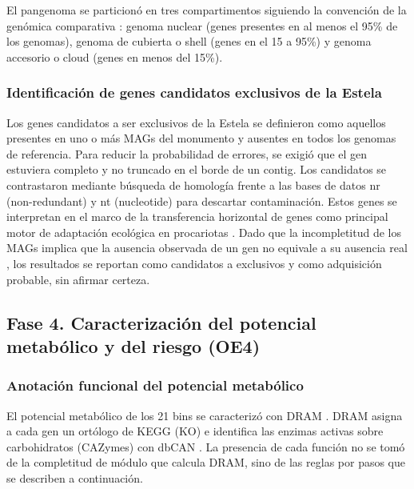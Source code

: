 El pangenoma se particionó en tres compartimentos siguiendo la convención de la genómica comparativa \cite{panaroo2020, tettelin2005, Page2015}: genoma nuclear (genes presentes en al menos el 95\% de los genomas), genoma de cubierta o shell (genes en el 15 a 95\%) y genoma accesorio o cloud (genes en menos del 15\%).

\subsubsection{Identificación de genes candidatos exclusivos de la Estela}

Los genes candidatos a ser exclusivos de la Estela se definieron como aquellos presentes en uno o más MAGs del monumento y ausentes en todos los genomas de referencia. Para reducir la probabilidad de errores, se exigió que el gen estuviera completo y no truncado en el borde de un contig. Los candidatos se contrastaron mediante búsqueda de homología frente a las bases de datos nr (non-redundant) y nt (nucleotide) para descartar contaminación. Estos genes se interpretan en el marco de la transferencia horizontal de genes como principal motor de adaptación ecológica en procariotas \cite{soucy2015}. Dado que la incompletitud de los MAGs implica que la ausencia observada de un gen no equivale a su ausencia real \cite{bowers2017}, los resultados se reportan como candidatos a exclusivos y como adquisición probable, sin afirmar certeza.

\subsection{Fase 4. Caracterización del potencial metabólico y del riesgo (OE4)}

\subsubsection{Anotación funcional del potencial metabólico}
\begin{nuevo}
El potencial metabólico de los 21 bins se caracterizó con DRAM \cite{dram2020}.
DRAM asigna a cada gen un ortólogo de KEGG (KO) e identifica las enzimas
activas sobre carbohidratos (CAZymes) con dbCAN \cite{zhang2018}. La presencia
de cada función no se tomó de la completitud de módulo que calcula DRAM, sino
de las reglas por pasos que se describen a continuación.
\end{nuevo}

